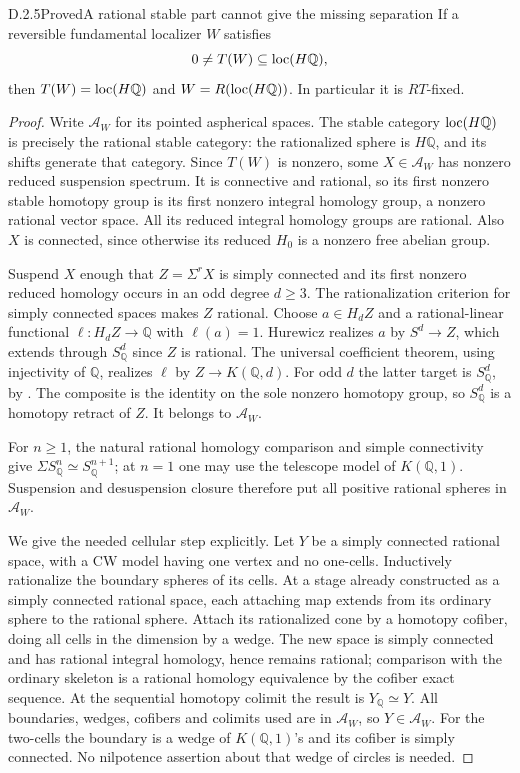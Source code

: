 \begin{claim}{D.2.5}{Proved}{A rational stable part cannot give the missing separation}
If a reversible fundamental localizer $W$ satisfies
\[
 0\ne T(W)\subseteq\operatorname{loc}(H\mathbb Q),
\]
then $T(W)=\operatorname{loc}(H\mathbb Q)$ and
$W=R(\operatorname{loc}(H\mathbb Q))$. In particular it is $RT$-fixed.
\end{claim}
\begin{proof}
Write $\mathcal A_W$ for its pointed aspherical spaces. The stable
category $\operatorname{loc}(H\mathbb Q)$ is precisely the rational stable category:
the rationalized sphere is $H\mathbb Q$, and its shifts generate that
category. Since $T(W)$ is nonzero, some $X\in\mathcal A_W$ has nonzero
reduced suspension spectrum. It is connective and rational, so its
first nonzero stable homotopy group is its first nonzero integral
homology group, a nonzero rational vector space. All its reduced
integral homology groups are rational. Also $X$ is connected, since
otherwise its reduced $H_0$ is a nonzero free abelian group.

Suspend $X$ enough that $Z=\Sigma^rX$ is simply connected and its first
nonzero reduced homology occurs in an odd degree $d\geq3$.
The rationalization criterion for simply connected spaces
\cite[Theorems~6.1.1--6.1.2]{FGHMayPonto2012} makes $Z$ rational.
Choose $a\in H_dZ$ and a rational-linear functional
$\ell:H_dZ\to\mathbb Q$ with $\ell(a)=1$.
Hurewicz realizes $a$ by $S^d\to Z$, which extends through
$S^d_{\mathbb Q}$ since $Z$ is rational. The universal coefficient
theorem, using injectivity of $\mathbb Q$, realizes $\ell$ by
$Z\to K(\mathbb Q,d)$. For odd $d$ the latter target is
$S^d_{\mathbb Q}$, by \cite[Corollary~6.7.3]{FGHMayPonto2012}.
The composite is the identity on the sole nonzero homotopy group, so
$S^d_{\mathbb Q}$ is a homotopy retract of $Z$. It belongs to
$\mathcal A_W$.

For $n\geq1$, the natural rational homology comparison and simple
connectivity give
$\Sigma S^n_{\mathbb Q}\simeq S^{n+1}_{\mathbb Q}$; at $n=1$ one
may use the telescope model of $K(\mathbb Q,1)$.
Suspension and desuspension closure therefore put all positive
rational spheres in $\mathcal A_W$.

We give the needed cellular step explicitly. Let $Y$ be a simply
connected rational space, with a CW model having one vertex and no
one-cells. Inductively rationalize the boundary spheres of its cells.
At a stage already constructed as a simply connected rational space,
each attaching map extends from its ordinary sphere to the rational
sphere. Attach its rationalized cone by a homotopy cofiber, doing all
cells in the dimension by a wedge. The new space is simply connected
and has rational integral homology, hence remains rational; comparison
with the ordinary skeleton is a rational homology equivalence by the
cofiber exact sequence. At the sequential homotopy colimit the result
is $Y_{\mathbb Q}\simeq Y$. All boundaries, wedges, cofibers and
colimits used are in $\mathcal A_W$, so $Y\in\mathcal A_W$.
For the two-cells the boundary is a wedge of $K(\mathbb Q,1)$'s and
its cofiber is simply connected. No nilpotence assertion about that
wedge of circles is needed.


\end{proof}
